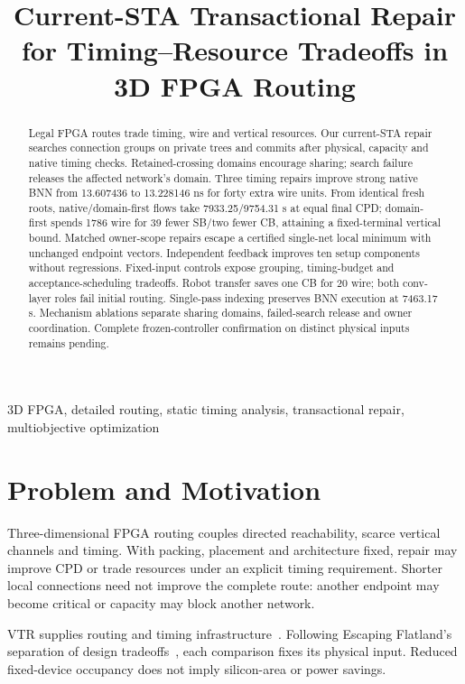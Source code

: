 \documentclass[conference,10pt]{IEEEtran}
\title{Current-STA Transactional Repair for Timing--Resource Tradeoffs in 3D FPGA Routing}
\author{\IEEEauthorblockN{Anonymous development manuscript}}
\begin{document}
\maketitle
\begin{abstract}
Legal FPGA routes trade timing, wire and vertical resources. Our current-STA repair searches connection groups on private trees and commits after physical, capacity and native timing checks. Retained-crossing domains encourage sharing; search failure releases the affected network's domain. Three timing repairs improve strong native BNN from 13.607436 to 13.228146 ns for forty extra wire units. From identical fresh roots, native/domain-first flows take 7933.25/9754.31 s at equal final CPD; domain-first spends 1786 wire for 39 fewer SB/two fewer CB, attaining a fixed-terminal vertical bound. Matched owner-scope repairs escape a certified single-net local minimum with unchanged endpoint vectors. Independent feedback improves ten setup components without regressions. Fixed-input controls expose grouping, timing-budget and acceptance-scheduling tradeoffs. Robot transfer saves one CB for 20 wire; both conv-layer roles fail initial routing. Single-pass indexing preserves BNN execution at 7463.17 s. Mechanism ablations separate sharing domains, failed-search release and owner coordination. Complete frozen-controller confirmation on distinct physical inputs remains pending.
\end{abstract}
\begin{IEEEkeywords}
3D FPGA, detailed routing, static timing analysis, transactional repair, multiobjective optimization
\end{IEEEkeywords}

\section{Problem and Motivation}
Three-dimensional FPGA routing couples directed reachability, scarce vertical channels and timing. With packing, placement and architecture fixed, repair may improve CPD or trade resources under an explicit timing requirement. Shorter local connections need not improve the complete route: another endpoint may become critical or capacity may block another network.

VTR supplies routing and timing infrastructure~\cite{vtr9paper}. Following Escaping Flatland's separation of design tradeoffs~\cite{flatland}, each comparison fixes its physical input. Reduced fixed-device occupancy does not imply silicon-area or power savings.
\end{document}
